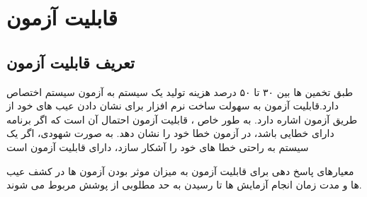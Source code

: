 \chapter{قابلیت آزمون}
\section{تعریف قابلیت آزمون}
طبق تخمین ها بین ۳۰ تا ۵۰ درصد هزینه تولید یک سیستم به آزمون سیستم اختصاص دارد.قابلیت آزمون به سهولت ساخت نرم افزار برای نشان دادن عیب های خود از طریق آزمون اشاره دارد. به طور خاص ، قابلیت آزمون احتمال آن است که اگر برنامه دارای خطایی باشد،‌ در آزمون خطا خود را نشان دهد. به صورت شهودی، اگر یک سیستم به راحتی خطا های خود را آشکار سازد، دارای قابلیت آزمون است

معیارهای پاسخ دهی برای قابلیت آزمون به میزان موثر بودن آزمون ها در کشف عیب ها و مدت زمان انجام آزمایش ها تا رسیدن به حد مطلوبی از پوشش مربوط می شوند.

